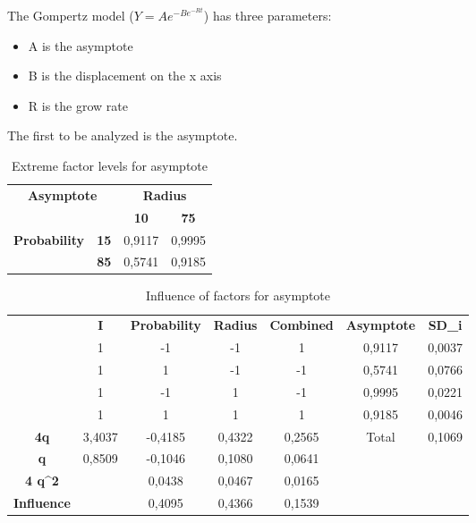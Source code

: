 The Gompertz model ($ Y = Ae^{-Be^{-Rt}} $) has three parameters:
\begin{itemize}
	\item A is the asymptote
	\item B is the displacement on the x axis
	\item R is the grow rate
\end{itemize}
The first to be analyzed is the asymptote.

\begin{table}[H]
\centering
\begin{tabular}{|cc|cc|}
\hline
\multicolumn{2}{|c|}{\multirow{2}{*}{\textbf{Asymptote}}} & \multicolumn{2}{c|}{\textbf{Radius}} \\ \cline{3-4} 
\multicolumn{2}{|c|}{} & \multicolumn{1}{c|}{\textbf{10}} & \textbf{75} \\ \hline
\multicolumn{1}{|c|}{\multirow{2}{*}{\textbf{Probability}}} & \textbf{15} & \multicolumn{1}{c|}{0,9117} & 0,9995 \\ \cline{2-4} 
\multicolumn{1}{|c|}{} & \textbf{85} & \multicolumn{1}{c|}{0,5741} & 0,9185 \\ \hline
\end{tabular}
\caption{Extreme factor levels for asymptote}
\end{table}

\begin{table}[H]
\centering
\begin{tabular}{c|c|c|c|c|cc}
\cline{2-7}
 & \textbf{I} & \textbf{Probability} & \textbf{Radius} & \textbf{Combined} & \multicolumn{1}{c|}{\textbf{Asymptote}} & \multicolumn{1}{c|}{\textbf{SD\_i}} \\ \cline{2-7} 
 & 1 & -1 & -1 & 1 & \multicolumn{1}{c|}{0,9117} & \multicolumn{1}{c|}{0,0037} \\ \cline{2-7} 
 & 1 & 1 & -1 & -1 & \multicolumn{1}{c|}{0,5741} & \multicolumn{1}{c|}{0,0766} \\ \cline{2-7} 
 & 1 & -1 & 1 & -1 & \multicolumn{1}{c|}{0,9995} & \multicolumn{1}{c|}{0,0221} \\ \cline{2-7} 
 & 1 & 1 & 1 & 1 & \multicolumn{1}{c|}{0,9185} & \multicolumn{1}{c|}{0,0046} \\ \hline
\multicolumn{1}{|c|}{\textbf{4q}} & 3,4037 & -0,4185 & 0,4322 & 0,2565 & \multicolumn{1}{c|}{Total} & \multicolumn{1}{c|}{0,1069} \\ \hline
\multicolumn{1}{|c|}{\textbf{q}} & 0,8509 & -0,1046 & 0,1080 & 0,0641 &  &  \\ \cline{1-5}
\multicolumn{1}{|c|}{\textbf{4 q\textasciicircum{}2}} &  & 0,0438 & 0,0467 & 0,0165 &  &  \\ \cline{1-5}
\multicolumn{1}{|c|}{\textbf{Influence}} &  & 0,4095 & 0,4366 & 0,1539 &  &  \\ \cline{1-5}
\end{tabular}
\caption{Influence of factors for asymptote}
\end{table}

